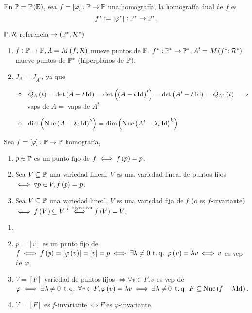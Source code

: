\begin{defi}
    En $\mathbb{P} = \mathbb{P} \left(\mathbb{E}\right)$, sea $f = [\varphi] : \mathbb{P} \to \mathbb{P}$ una homografía, la homografía dual de $f$ es
    \[
        f^* := [\varphi^*] : \mathbb{P}^* \to \mathbb{P}^*.
    \]
\end{defi}
\begin{obs}
    $\mathbb{P}, \mathcal{R}$ referencia $\to \left(\mathbb{P}^*, \mathcal{R}^*\right)$
    \begin{enumerate}
        \item $f : \mathbb{P} \to \mathbb{P}, A = M \left( f; \mathcal{R}\right)$ mueve puntos de $\mathbb{P}$. $f^* : \mathbb{P}^* \to \mathbb{P}^*, A^t = M \left( f^*; \mathcal{R}^* \right)$ mueve puntos de $\mathbb{P}^*$ (hiperplanos de $\mathbb{P}$).
        \item $J_A = J_{A^t}$, ya que
            \begin{itemize}
            \item $Q_A \left( t \right) = \det\left( A- t\operatorname{Id}\right) = \det\left(\left( A-t\operatorname{Id}\right)^t\right) = \det\left( A^t-t\operatorname{Id}\right) = Q_{A^t} \left( t\right) \implies$ vaps de $A =$ vaps de $A^t$ 
            \item $\dim\left(\text{Nuc}\left( A-\lambda_i\operatorname{Id}\right)^k\right)=\dim\left(\text{Nuc}\left( A^t-\lambda_i\operatorname{Id}\right)^k\right)$
            \end{itemize}
    \end{enumerate}
\end{obs}
\begin{defi}
    Sea $f = [\varphi]: \mathbb{P} \to \mathbb{P}$ homografía,
    \begin{enumerate}
        \item $p \in \mathbb{P}$ es un punto fijo de $f \iff f\left( p \right) = p$.
        \item Sea $V \subseteq \mathbb{P}$ una variedad lineal, $V$ es una variedad lineal de puntos fijos $\iff \forall p \in V, f\left( p\right) = p$.
        \item Sea $V \subseteq \mathbb{P}$ una variedad lineal, $V$ es una variedad fija de $f$ (o es $f$-invariante) $\iff f\left( V\right) \subseteq V \stackrel{f \text{ biyectiva}}{\iff} f \left( V \right) = V$.
    \end{enumerate}
\end {defi}
\begin{obs}
    \begin{enumerate}
        \item[]
        \item $p = [v]$ es un punto fijo de $f \iff f\left( p\right) = [\varphi \left( v\right)] = [v] = p \iff \exists\lambda\neq 0 \operatorname{\;t.q.\;} \varphi\left( v\right)=\lambda v \iff v$ es vep de $\varphi$.
        \item $V=[F]$ variedad de puntos fijos $\iff \forall v \in F, v$ es vep de $\varphi \iff \exists\lambda\neq 0 \operatorname{\;t.q.\;} \forall v \in F, \varphi\left( v\right) = \lambda v \iff \exists \lambda \neq 0 \operatorname{\;t.q.\;} F \subseteq \text{Nuc}\left( f - \lambda\operatorname{Id}\right)$.
        \item $V = [F]$ es $f$-invariante $\iff F$ es $\varphi$-invariante.
    \end{enumerate}
\end{obs}
